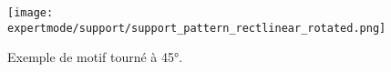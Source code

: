 \begin{figure}[H]
\centering
\texttt{[image: expertmode/support/support\_pattern\_rectlinear\_rotated.png]}
\caption{Exemple de motif tourn\'e \`a 45°.}
\label{fig:support_pattern_rectlinear_rotated}
\end{figure}




